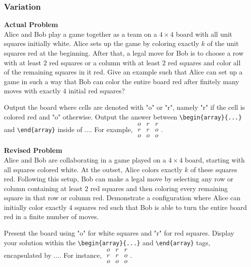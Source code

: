 \subsubsection{Variation}
\textbf{Actual Problem}\\
Alice and Bob play a game together as a team on a $4 \times 4$ board with all unit squares initially white. Alice sets up the game by coloring exactly $k$ of the unit squares red at the beginning. After that, a legal move for Bob is to choose a row with at least $2$ red squares or a column with at least $2$ red squares and color all of the remaining squares in it red. Give an example such that Alice can set up a game in such a way that Bob can color the entire board red after finitely many moves with exactly $4$ initial red squares?

Output the board where cells are denoted with "o" or "r", namely "r" if the cell is colored red and "o" otherwise. Output the answer between \verb|\begin{array}{...}| and \verb|\end{array}| inside of $\boxed{...}$. For example, $\boxed{\begin{array}{ccc}o & r & r \\ r & r & o \\ o & o & o\end{array}}$.

\textbf{Revised Problem}\\
Alice and Bob are collaborating in a game played on a $4 \times 4$ board, starting with all squares colored white. At the outset, Alice colors exactly $k$ of these squares red. Following this setup, Bob can make a legal move by selecting any row or column containing at least $2$ red squares and then coloring every remaining square in that row or column red. Demonstrate a configuration where Alice can initially color exactly $4$ squares red such that Bob is able to turn the entire board red in a finite number of moves.

Present the board using "o" for white squares and "r" for red squares. Display your solution within the \verb|\begin{array}{...}| and \verb|\end{array}| tags, encapsulated by $\boxed{...}$. For instance, $\boxed{\begin{array}{ccc}o & r & r \\ r & r & o \\ o & o & o\end{array}}$.


